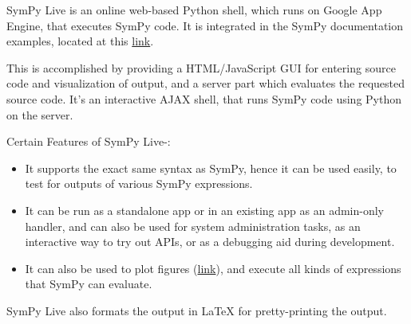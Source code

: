 SymPy Live is an online web-based Python shell, which runs on Google
App Engine, that executes SymPy code. It is integrated in the SymPy
documentation examples, located at this \href{http://docs.sympy.org/latest/index.html}{link}.

This is accomplished by providing a HTML/JavaScript GUI for entering
source code and visualization of output, and a server part which
evaluates the requested source code. It's an interactive AJAX shell,
that runs SymPy code using Python on the server.

Certain Features of SymPy Live-:

\begin{itemize}
\item
  It supports the exact same syntax as SymPy, hence it can be used
  easily, to test for outputs of various SymPy expressions.
\item
  It can be run as a standalone app or in an existing app as an
  admin-only handler, and can also be used for system administration
  tasks, as an interactive way to try out APIs, or as a debugging aid
  during development.
\item
  It can also be used to plot figures (\href{http://live.sympy.org/?evaluate=from\%20sympy\%20import\%20symbols\%0Afrom\%20sympy.plotting\%20import\%20textplot\%0Ax\%20\%3D\%20symbols(\%27x\%27)\%0Atextplot(x**2\%2C0\%2C5)\%0A\%23--\%0A}{link}), 
  and execute all kinds of expressions that SymPy can evaluate.
\end{itemize}

SymPy Live also formats the output in LaTeX for pretty-printing the
output.